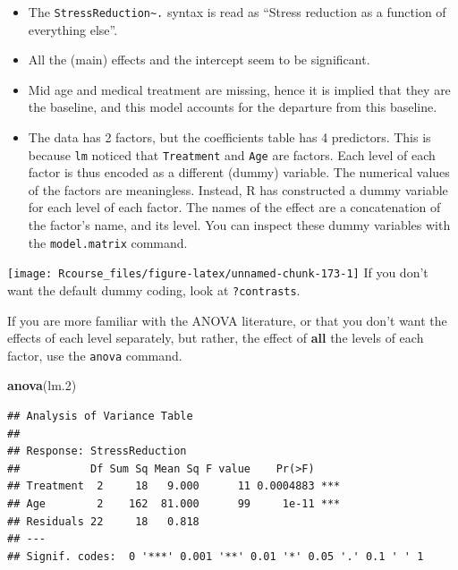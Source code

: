 \documentclass[]{book}
\newenvironment{Shaded}{\begin{snugshade}}{\end{snugshade}}
\newcommand{\KeywordTok}[1]{\textcolor[rgb]{0.13,0.29,0.53}{\textbf{#1}}}
\newcommand{\DecValTok}[1]{\textcolor[rgb]{0.00,0.00,0.81}{#1}}
\newcommand{\StringTok}[1]{\textcolor[rgb]{0.31,0.60,0.02}{#1}}
\newcommand{\OperatorTok}[1]{\textcolor[rgb]{0.81,0.36,0.00}{\textbf{#1}}}
\newcommand{\NormalTok}[1]{#1}
\theoremstyle{definition}
\theoremstyle{definition}
\theoremstyle{definition}
\theoremstyle{remark}
\begin{document}
\begin{itemize}
\item
  The \texttt{StressReduction\textasciitilde{}.} syntax is read as
  ``Stress reduction as a function of everything else''.
\item
  All the (main) effects and the intercept seem to be significant.
\item
  Mid age and medical treatment are missing, hence it is implied that
  they are the baseline, and this model accounts for the departure from
  this baseline.
\item
  The data has 2 factors, but the coefficients table has 4 predictors.
  This is because \texttt{lm} noticed that \texttt{Treatment} and
  \texttt{Age} are factors. Each level of each factor is thus encoded as
  a different (dummy) variable. The numerical values of the factors are
  meaningless. Instead, R has constructed a dummy variable for each
  level of each factor. The names of the effect are a concatenation of
  the factor's name, and its level. You can inspect these dummy
  variables with the \texttt{model.matrix} command.
\end{itemize}

\begin{Shaded}
\end{Shaded}

\texttt{[image: Rcourse\_files/figure-latex/unnamed-chunk-173-1]}
If you don't want the default dummy coding, look at \texttt{?contrasts}.

If you are more familiar with the ANOVA literature, or that you don't
want the effects of each level separately, but rather, the effect of
\textbf{all} the levels of each factor, use the \texttt{anova} command.

\begin{Shaded}
\begin{Highlighting}[]
\KeywordTok{anova}\NormalTok{(lm.}\DecValTok{2}\NormalTok{)}
\end{Highlighting}
\end{Shaded}

\begin{verbatim}
## Analysis of Variance Table
## 
## Response: StressReduction
##           Df Sum Sq Mean Sq F value    Pr(>F)    
## Treatment  2     18   9.000      11 0.0004883 ***
## Age        2    162  81.000      99     1e-11 ***
## Residuals 22     18   0.818                      
## ---
## Signif. codes:  0 '***' 0.001 '**' 0.01 '*' 0.05 '.' 0.1 ' ' 1
\end{verbatim}
\end{document}
